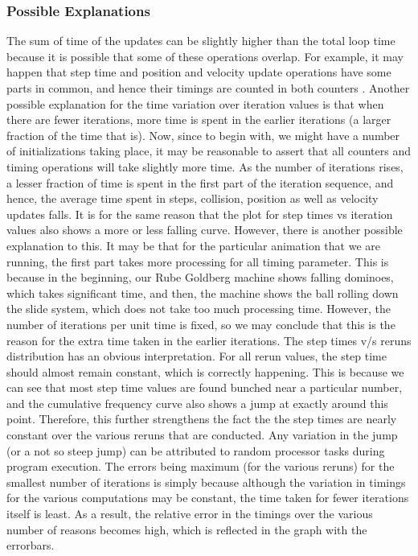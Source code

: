 \documentclass[a4paper,11pt]{article}
\begin{document}
	\subsubsection{Possible Explanations}
	The sum of time of the updates can be slightly higher than the total loop time because it is possible that some of these operations overlap. For example, it may happen that step time and position and velocity update operations have some parts in common, and hence their timings are counted in both counters .
	Another possible explanation for the time variation over iteration values is that when there are fewer iterations, more time is spent in the earlier iterations (a larger fraction of the time that is).
	Now, since to begin with, we might have a number of initializations taking place, it may be reasonable to assert that all counters and timing operations will take slightly more time.
	As the number of iterations rises, a lesser fraction of time is spent in the first part of the iteration sequence, and hence, the average time spent in steps, collision, position as well as velocity updates falls. It is for the same reason that the plot for step times vs iteration values also shows a more or less falling curve.
	However, there is another possible explanation to this. It may be that for the particular animation that we are running, the first part takes more processing for all timing parameter. This is because in the beginning, our Rube Goldberg machine shows falling dominoes, which takes significant time, and then, the machine shows the ball rolling down the slide system, which does not take too much processing time. However, the number of iterations per unit time is fixed, so we may conclude that this is the reason for the extra time taken in the earlier iterations.
	The step times v/s reruns distribution has an obvious interpretation. For all rerun values, the step time should almost remain constant, which is correctly happening. This is because we can see that most step time values are found bunched near a particular number, and the cumulative frequency curve also shows a jump at exactly around this point. Therefore, this further strengthens the fact the the step times are nearly constant over the various reruns that are conducted. Any variation in the jump (or a not so steep jump) can be attributed to random processor tasks during program execution.
	The errors being maximum (for the various reruns) for the smallest number of iterations is simply because although the variation in timings for the various computations may be constant, the time taken for fewer iterations itself is least. As a result, the relative error in the timings over the various number of reasons becomes high, which is reflected in the graph with the errorbars.
\end{document}
